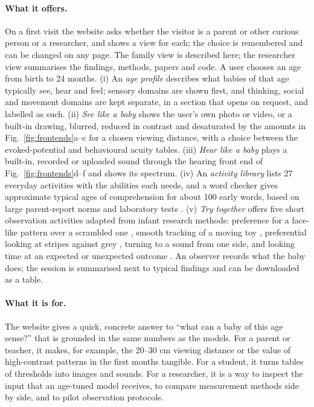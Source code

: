 \documentclass{article}
\begin{document}
\paragraph{What it offers.} On a first visit the website asks whether the visitor is a parent or other curious person or a researcher, and shows a view for each; the choice is remembered and can be changed on any page. The family view is described here; the researcher view summarises the findings, methods, papers and code. A user chooses an age from birth to 24 months. (i) An \emph{age profile} describes what babies of that age typically see, hear and feel; sensory domains are shown first, and thinking, social and movement domains are kept separate, in a section that opens on request, and labelled as such. (ii) \emph{See like a baby} shows the user's own photo or video, or a built-in drawing, blurred, reduced in contrast and desaturated by the amounts in Fig.~\ref{fig:frontends}a--c for a chosen viewing distance, with a choice between the evoked-potential and behavioural acuity tables. (iii) \emph{Hear like a baby} plays a built-in, recorded or uploaded sound through the hearing front end of Fig.~\ref{fig:frontends}d--f and shows its spectrum. (iv) An \emph{activity library} lists 27 everyday activities with the abilities each needs, and a word checker gives approximate typical ages of comprehension for about 100 early words, based on large parent-report norms and laboratory tests \autocite{frank2021variability,bergelson2012}. (v) \emph{Try together} offers five short observation activities adapted from infant research methods: preference for a face-like pattern over a scrambled one \autocite{johnson1991newborns}, smooth tracking of a moving toy \autocite{vonhofsten1997development}, preferential looking at stripes against grey \autocite{teller1997first}, turning to a sound from one side, and looking time at an expected or unexpected outcome \autocite{baillargeon1987object}. An observer records what the baby does; the session is summarised next to typical findings and can be downloaded as a table.

\paragraph{What it is for.} The website gives a quick, concrete answer to ``what can a baby of this age sense?'' that is grounded in the same numbers as the models. For a parent or teacher, it makes, for example, the 20--30 cm viewing distance or the value of high-contrast patterns in the first months tangible. For a student, it turns tables of thresholds into images and sounds. For a researcher, it is a way to inspect the input that an age-tuned model receives, to compare measurement methods side by side, and to pilot observation protocols.
\end{document}
